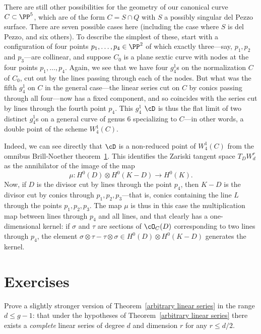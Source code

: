 There are still other possibilities for the geometry of our canonical curve $C \subset \PP^5$, which are of the form $C = S \cap Q$ with $S$ a possibly singular del Pezzo surface. There are seven possible cases here (including the case where $S$ is del Pezzo, and six others). To describe the simplest of these, start with a configuration of four points  $p_1,\dots,p_4 \in \PP^2$ of which exactly three---say, $p_1,p_2$ and $p_3$---are collinear, and suppose $C_0$ is a plane sextic curve with nodes at the four points  $p_1,\dots,p_4$. Again, we see that we have four $g^1_4$s on the normalization $C$ of $C_0$, cut out by the lines passing through each of the nodes. But what was the fifth $g^1_4$ on $C$ in the general case---the linear series cut on $C$ by conics passing through all four---now has a fixed component, and so coincides with the series cut by lines through the fourth point $p_4$. This $g^1_4$ $\cD$ is thus the flat limit of two distinct $g^1_4$s on a general curve of genus 6 specializing to $C$---in other words, a double point of the scheme $W^1_4(C)$.

Indeed, we can see directly that $\cD$ is a non-reduced point of $W^1_4(C)$ from the omnibus Brill-Noether theorem~\ref{}. This identifies the Zariski tangent space $T_DW^r_d$ as the annihilator of the image of the map
$$
\mu : H^0(D) \otimes H^0(K-D) \to H^0(K).
$$
Now, if $D$ is the divisor cut by lines through the point $p_4$, then $K-D$ is the divisor cut by conics through $p_1,p_2,p_3$---that is, conics containing the line $L$ through the points $p_1,p_2,p_3$. The map $\mu$ is thus in this case the multiplication map between lines through $p_4$ and all lines, and that clearly has a one-dimensional kernel: if $\sigma$ and $\tau$ are sections of $\cO_C(D)$ corresponding to two lines through $p_4$, the element $\sigma \otimes \tau - \tau \otimes \sigma \in H^0(D) \otimes H^0(K-D)$ generates the kernel.


\section{Exercises}

\begin{exercise}
Prove a slightly stronger version of Theorem~\ref{arbitrary linear series} in the range $d \leq g-1$: that under the hypotheses of Theorem~\ref{arbitrary linear series} there exists a \emph{complete} linear series of degree $d$ and dimension $r$ for any $r \leq d/2$.
\end{exercise}

